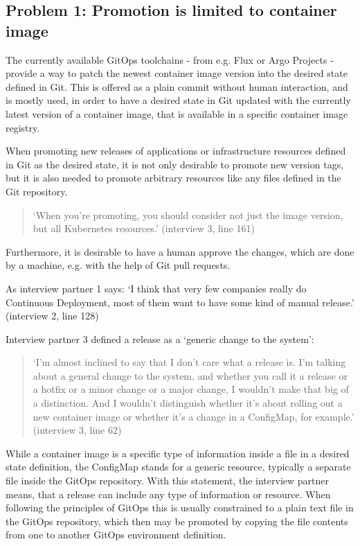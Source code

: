 \subsection{Problem 1: Promotion is limited to container image}
\label{problem1}

The currently available GitOps toolchains -
from e.g. Flux or Argo Projects -
provide a way to patch the newest container image version
into the desired state defined in Git.
This is offered as a plain commit without human interaction,
and is mostly used, in order to have a desired state in Git updated with
the currently latest version of a container image,
that is available in a specific container image registry.

When promoting new releases of applications or infrastructure resources defined in Git as the 
desired state, it is not only desirable to promote new version tags,
but it is also needed to promote arbitrary resources like any files
defined in the Git repository.

\begin{quotation}
	\noindent
	\enquote*{When you're promoting, you should consider not just the image version, but all Kubernetes resources.}
	(interview 3, line 161)
\end{quotation}

Furthermore, it is desirable to have a human approve the changes,
which are done by a machine, e.g. with the help of Git pull requests.

As interview partner 1 says:
\enquote*{I think that very few companies really do Continuous Deployment, most of them want to have some kind of manual release.}
(interview 2, line 128)

Interview partner 3 defined a release
as a \enquote*{generic change to the system}:

\begin{quotation}
	\noindent
	\enquote*{I'm almost inclined to say that I don't care what a release is. I'm talking about a general change to the system, and whether you call it a release or a hotfix or a minor change or a major change, I wouldn't make that big of a distinction. And I wouldn't distinguish whether it's about rolling out a new container image or whether it's a change in a ConfigMap, for example.}
	(interview 3, line 62)
\end{quotation}

While a container image is a specific type of information inside a file in a desired state definition,
the ConfigMap stands for a generic resource, typically a separate file inside the GitOps repository.
With this statement, the interview partner means, that a release can include any type of information
or resource. When following the principles of GitOps this is usually constrained to a plain text
file in the GitOps repository, which then may be promoted by copying the file contents from
one to another GitOps environment definition.

